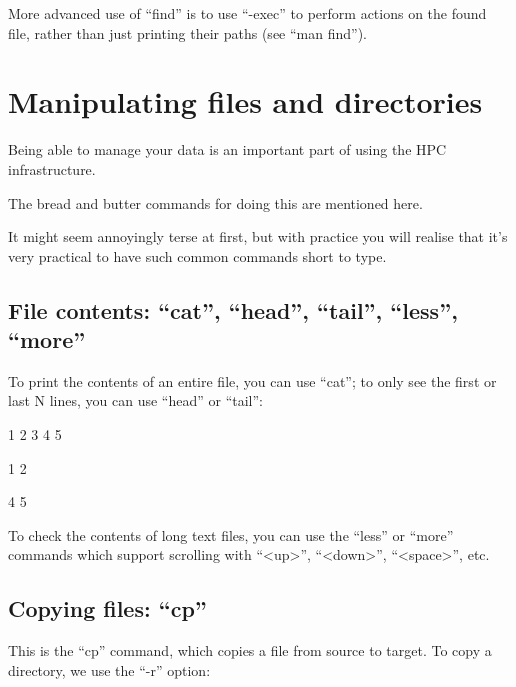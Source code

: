 More advanced use of ``find'' is to use ``-exec'' to perform actions on the
found file, rather than just printing their paths (see ``man find'').

\chapter{Manipulating files and directories}

Being able to manage your data is an important part of using the HPC infrastructure. 

The bread and butter commands for doing this are mentioned here.

It might seem annoyingly terse at first, but with practice you will realise that it's very practical to have such common commands short to type.

\section{File contents: ``cat'', ``head'', ``tail'', ``less'', ``more''}

To print the contents of an entire file, you can use ``cat''; to only see the first or last N lines, you can use ``head'' or ``tail'':

\begin{prompt}
  1
  2
  3
  4
  5

  1
  2

  4 
  5
\end{prompt}

To check the contents of long text files, you can use the ``less'' or ``more''
commands which support scrolling with ``<up>'', ``<down>'', ``<space>'', etc.

\section{Copying files: ``cp''}

\begin{prompt}
\end{prompt}

This is the ``cp'' command, which copies a file from source to target. To copy a directory, we use the ``-r'' option:

\begin{prompt}
\end{prompt}

